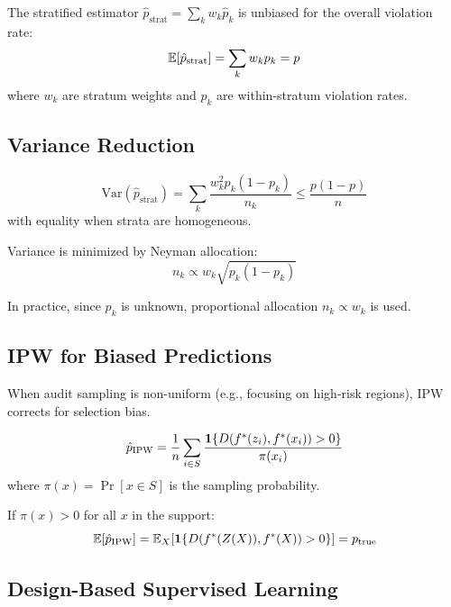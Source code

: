\begin{theorem}
The stratified estimator $\hat{p}_{\text{strat}} = \sum_k w_k \hat{p}_k$ is unbiased for the overall violation rate:
\[
\mathbb{E}[\hat{p}_{\text{strat}}] = \sum_k w_k p_k = p
\]
where $w_k$ are stratum weights and $p_k$ are within-stratum violation rates.
\end{theorem}

\subsection{Variance Reduction}

\begin{theorem}
\[
\text{Var}(\hat{p}_{\text{strat}}) = \sum_k \frac{w_k^2 p_k(1-p_k)}{n_k} \le \frac{p(1-p)}{n}
\]
with equality when strata are homogeneous.
\end{theorem}

\begin{proposition}
Variance is minimized by Neyman allocation:
\[
n_k \propto w_k \sqrt{p_k(1-p_k)}
\]
\end{proposition}

In practice, since $p_k$ is unknown, proportional allocation $n_k \propto w_k$ is used.

\subsection{IPW for Biased Predictions}

When audit sampling is non-uniform (e.g., focusing on high-risk regions), IPW corrects for selection bias.

\begin{definition}
\[
\hat{p}_{\text{IPW}} = \frac{1}{n} \sum_{i \in S} \frac{\mathbf{1}\{D(f^{\ast}(z_i), f^{\ast}(x_i)) > 0\}}{\pi(x_i)}
\]
where $\pi(x) = \Pr[x \in S]$ is the sampling probability.
\end{definition}

\begin{theorem}
If $\pi(x) > 0$ for all $x$ in the support:
\[
\mathbb{E}[\hat{p}_{\text{IPW}}] = \mathbb{E}_X[\mathbf{1}\{D(f^{\ast}(Z(X)), f^{\ast}(X)) > 0\}] = p_{\text{true}}
\]
\end{theorem}

\subsection{Design-Based Supervised Learning}

